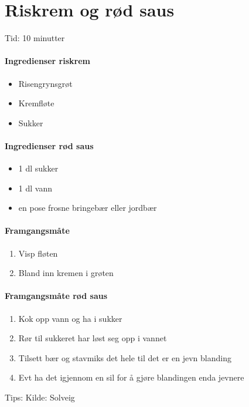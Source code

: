 \section{Riskrem og rød saus}
\label{riskrem}

Tid: 10 minutter

\paragraph{Ingredienser riskrem}
\begin{itemize}[noitemsep]
	\item Risengrynsgrøt
	\item Kremfløte
	\item Sukker
\end{itemize}

\paragraph{Ingredienser rød saus}
\begin{itemize}[noitemsep]
	\item 1 dl sukker
	\item 1 dl vann
	\item en pose frosne bringebær eller jordbær
\end{itemize}

\paragraph{Framgangsmåte}
\begin{enumerate}[noitemsep]
	\item Visp fløten
	\item Bland inn kremen i grøten
\end{enumerate}

\paragraph{Framgangsmåte rød saus}
\begin{enumerate}[noitemsep]
	\item Kok opp vann og ha i sukker
	\item Rør til sukkeret har løst seg opp i vannet
	\item Tilsett bær og stavmiks det hele til det er en jevn blanding
	\item Evt ha det igjennom en sil for å gjøre blandingen enda jevnere
\end{enumerate}




Tips:
Kilde: Solveig
